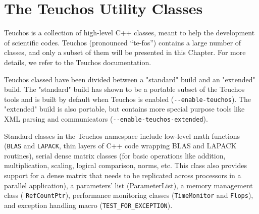 % 
% 
% 
%   
%   
% 
% 

\section{The Teuchos Utility Classes}
\label{chap:teuchos}

Teuchos is a collection of high-level C++ classes, meant to 
help the development of scientific codes. Teuchos (pronounced
``te-fos'') contains a large number of classes, and only a subset of
them will be presented in this Chapter. For more details, we refer to
the Teuchos documentation.

Teuchos classed have been divided between a "standard" build and an
"extended" build. The "standard" build has shown to be a portable subset
of the Teuchos tools and is built by default when Teuchos is enabled
(\verb!--enable-teuchos!). The "extended" build is also portable, but
contains more special purpose tools like XML parsing and communicators
(\verb!--enable-teuchos-extended!).

Standard classes in the Teuchos namespace include low-level math functions ({\tt BLAS}
and {\tt LAPACK}, thin layers of C++ code wrapping BLAS and
LAPACK routines), serial dense matrix classes (for basic operations like
addition, multiplication, scaling, logical comparison, norms, etc. This
class also provides support for a dense matrix that needs to be
replicated across processors in a parallel application), a parameters'
list (ParameterList), a memory management class (
\verb!RefCountPtr!), performance monitoring classes
(\verb!TimeMonitor! and \verb!Flops!), and exception
handling macro (\verb!TEST_FOR_EXCEPTION!).

